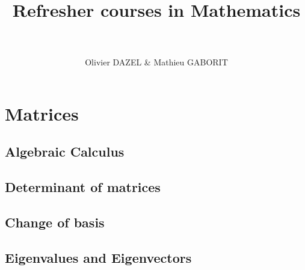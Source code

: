 \documentclass[10pt,a4paper]{report}
\title{\Large \textbf{Refresher courses in Mathematics}\\\
}
\author{Olivier DAZEL \& Mathieu GABORIT}
\begin{document}
\maketitle




\chapter{Matrices}


\section{Algebraic Calculus}








%


\section{Determinant of matrices}









%


\section{Change of basis}





\section{Eigenvalues and Eigenvectors}

%




\end{document}
